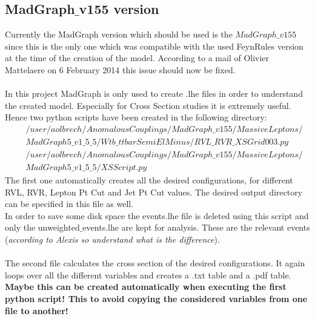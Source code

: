 \documentclass[a4paper,12pt]{report}
\begin{document}
\subsection{MadGraph$\_$v155 version}
Currently the MadGraph version which should be used is the $MadGraph\_v155$ since this is the only one which was compatible with the used FeynRules version at the time of the creation of the model. According to a mail of Olivier Mattelaere on 6 February 2014 this issue should now be fixed.\\
\\
In this project MadGraph is only used to create .lhe files in order to understand the created model. Especially for Cross Section studies it is extremely useful.\\
Hence two python scripts have been created in the following directory:
\begin{eqnarray*}
  & & /user/aolbrech/AnomalousCouplings/MadGraph\_v155/MassiveLeptons/\\ & & MadGraph5\_v1\_5\_5/Wtb\_ttbarSemiElMinus/RVL\_RVR\_XSGrid003.py \\
  & & /user/aolbrech/AnomalousCouplings/MadGraph\_v155/MassiveLeptons/\\ & & MadGraph5\_v1\_5\_5/XSScript.py
\end{eqnarray*}
The first one automatically creates all the desired configurations, for different RVL, RVR, Lepton Pt Cut and Jet Pt Cut values. The desired output directory can be specified in this file as well.\\
In order to save some disk space the events.lhe file is deleted using this script and only the unweighted$\_$events.lhe are kept for analysis. These are the relevant events (\textit{according to Alexis so understand what is the difference}).\\
\\
The second file calculates the cross section of the desired configurations. It again loops over all the different variables and creates a .txt table and a .pdf table.\\
\textbf{Maybe this can be created automatically when executing the first python script! This to avoid copying the considered variables from one file to another!}
\end{document}

